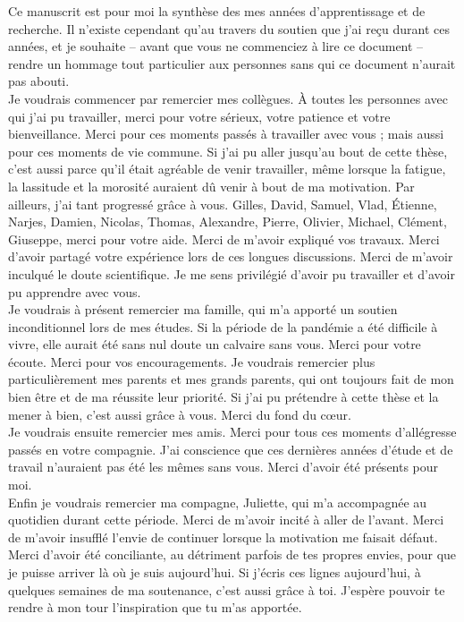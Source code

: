 \vfil

Ce manuscrit est pour moi la synthèse des mes années d'apprentissage et de recherche. Il n'existe cependant qu'au travers du soutien que j'ai reçu durant ces années, et je souhaite -- avant que vous ne commenciez à lire ce document -- rendre un hommage tout particulier aux personnes sans qui ce document n'aurait pas abouti.\\

Je voudrais commencer par remercier mes collègues. À toutes les personnes avec qui j'ai pu travailler, merci pour votre sérieux, votre patience et votre bienveillance. Merci pour ces moments passés à travailler avec vous ; mais aussi pour ces moments de vie commune. Si j'ai pu aller jusqu'au bout de cette thèse, c'est aussi parce qu'il était agréable de venir travailler, même lorsque la fatigue, la lassitude et la morosité auraient dû venir à bout de ma motivation. Par ailleurs, j'ai tant progressé grâce à vous. Gilles, David, Samuel, Vlad, Étienne, Narjes, Damien, Nicolas, Thomas, Alexandre, Pierre, Olivier, Michael, Clément, Giuseppe, merci pour votre aide. Merci de m'avoir expliqué vos travaux. Merci d'avoir partagé votre expérience lors de ces longues discussions. Merci de m'avoir inculqué le doute scientifique. Je me sens privilégié d'avoir pu travailler et d'avoir pu apprendre avec vous.\\

Je voudrais à présent remercier ma famille, qui m'a apporté un soutien inconditionnel lors de mes études. Si la période de la pandémie a été difficile à vivre, elle aurait été sans nul doute un calvaire sans vous. Merci pour votre écoute. Merci pour vos encouragements. Je voudrais remercier plus particulièrement mes parents et mes grands parents, qui ont toujours fait de mon bien être et de ma réussite leur priorité. Si j'ai pu prétendre à cette thèse et la mener à bien, c'est aussi grâce à vous. Merci du fond du cœur.\\

Je voudrais ensuite remercier mes amis. Merci pour tous ces moments d'allégresse passés en votre compagnie. J'ai conscience que ces dernières années d'étude et de travail n'auraient pas été les mêmes sans vous. Merci d'avoir été présents pour moi.\\

Enfin je voudrais remercier ma compagne, Juliette, qui m'a accompagnée au quotidien durant cette période. Merci de m'avoir incité à aller de l'avant. Merci de m'avoir insufflé l'envie de continuer lorsque la motivation me faisait défaut. Merci d'avoir été conciliante, au détriment parfois de tes propres envies, pour que je puisse arriver là où je suis aujourd'hui. Si j'écris ces lignes aujourd'hui, à quelques semaines de ma soutenance, c'est aussi grâce à toi. J'espère pouvoir te rendre à mon tour l'inspiration que tu m'as apportée.

\vfil
